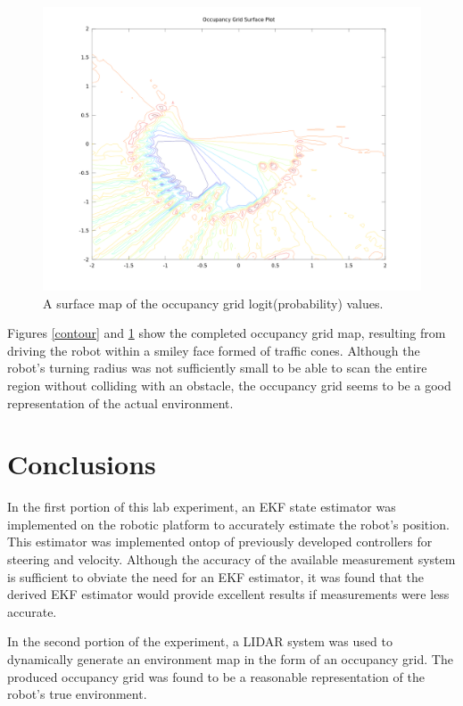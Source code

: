 \documentclass[11pt]{article} %
\begin{document}
\begin{figure}[hbt]
 \centering
 \includegraphics[scale=0.38]{SurfacePlot.png}
 \caption{A surface map of the occupancy grid logit(probability) values.}
 \label{surface}
\end{figure}

Figures \ref{contour} and \ref{surface} show the completed occupancy grid map, resulting from driving the robot within a smiley face formed of traffic cones.  Although the robot's turning radius was not sufficiently small to be able to scan the entire region without colliding with an obstacle, the occupancy grid seems to be a good representation of the actual environment.

\clearpage

\section{Conclusions}

In the first portion of this lab experiment, an EKF state estimator was implemented on the robotic platform to accurately estimate the robot's position. This estimator was implemented ontop of previously developed controllers for steering and velocity.  Although the accuracy of the available measurement system is sufficient to obviate the need for an EKF estimator, it was found that the derived EKF estimator would provide excellent results if measurements were less accurate.

In the second portion of the experiment, a LIDAR system was used to dynamically generate an environment map in the form of an occupancy grid.  The produced occupancy grid was found to be a reasonable representation of the robot's true environment.
\end{document}
